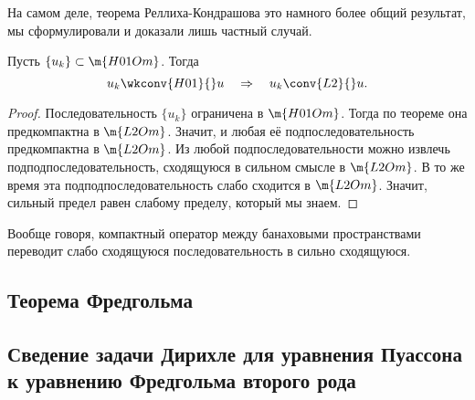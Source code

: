 \begin{note}
На самом деле, теорема Реллиха-Кондрашова это намного более общий результат, мы сформулировали и доказали лишь частный случай. 
\end{note}

\begin{corollary} Пусть $\{ u_k \} \subset \m{H01Om}$. Тогда
$$ u_k \wkconv{H01}{} u \quad \Rightarrow \quad u_k \conv{L2}{} u.$$
\end{corollary}
\begin{proof}
Последовательность $\{ u_k \}$ ограничена в $\m{H01Om}$. Тогда по теореме она предкомпактна в $\m{L2Om}$. Значит, и любая её подпоследовательность предкомпактна в $\m{L2Om}$. Из любой подпоследовательности можно извлечь подподпоследовательность, сходящуюся в сильном смысле в $\m{L2Om}$. В то же время эта подподпоследовательность слабо сходится в $\m{L2Om}$. Значит, сильный предел равен слабому пределу, который мы знаем.

\end{proof}
\begin{note} Вообще говоря, компактный оператор между банаховыми пространствами переводит слабо сходящуюся последовательность в сильно сходящуюся.
\end{note}

\subsection{Теорема Фредгольма}

\subsection{Сведение задачи Дирихле для уравнения Пуассона к уравнению Фредгольма второго рода}


